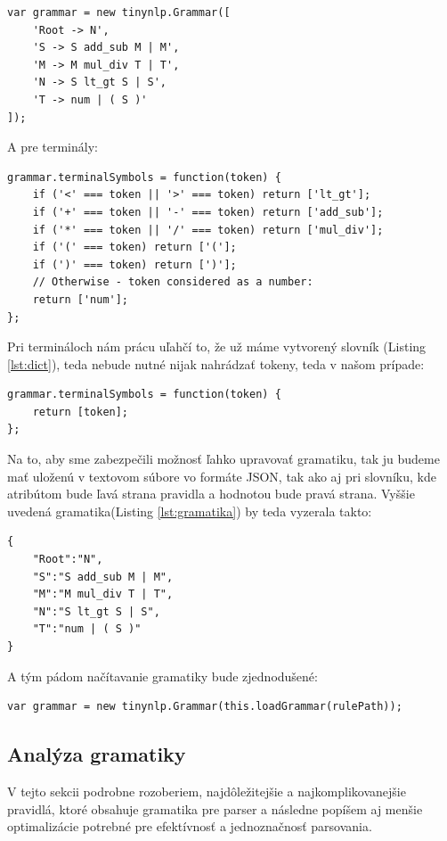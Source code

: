 \documentclass[12pt,a4paper]{report}
\theoremstyle{definition}
\theoremstyle{remark}
\begin{document}
\begin{lstlisting}[caption={Ukážková gramatika},label={lst:gramatika},style=htmlcssjs]
var grammar = new tinynlp.Grammar([
    'Root -> N',
    'S -> S add_sub M | M',
    'M -> M mul_div T | T',
    'N -> S lt_gt S | S',
    'T -> num | ( S )'
]);
\end{lstlisting}

\bigskip A pre terminály: 

\begin{lstlisting}[caption={Vytvorenie pravidiel pre terminály}, style=htmlcssjs]
grammar.terminalSymbols = function(token) {
    if ('<' === token || '>' === token) return ['lt_gt'];
    if ('+' === token || '-' === token) return ['add_sub'];
    if ('*' === token || '/' === token) return ['mul_div'];
    if ('(' === token) return ['('];
    if (')' === token) return [')'];
    // Otherwise - token considered as a number:
    return ['num'];
};
\end{lstlisting}

\bigskip Pri termináloch nám prácu uľahčí to, že už máme vytvorený slovník (Listing \ref{lst:dict}), teda nebude nutné nijak nahrádzať tokeny, teda v našom prípade: \\
\begin{lstlisting}[style=htmlcssjs]
grammar.terminalSymbols = function(token) {
    return [token];
};
\end{lstlisting}
\bigskip
Na to, aby sme zabezpečili možnosť ľahko upravovať gramatiku, tak ju budeme mať uloženú v textovom súbore vo formáte JSON, tak ako aj pri slovníku, kde atribútom bude ľavá strana pravidla a hodnotou bude pravá strana. Vyššie uvedená gramatika(Listing \ref{lst:gramatika}) by teda vyzerala takto:

\begin{lstlisting}[caption={Ukážková gramatika V JSON-e},label={lst:gramatikaJSON},style=htmlcssjs]
{
	"Root":"N",
	"S":"S add_sub M | M",
	"M":"M mul_div T | T",
	"N":"S lt_gt S | S",
	"T":"num | ( S )"
}
\end{lstlisting}

A tým pádom načítavanie gramatiky bude zjednodušené: \\

\begin{lstlisting}[style=htmlcssjs]
var grammar = new tinynlp.Grammar(this.loadGrammar(rulePath));
\end{lstlisting}

\subsection{Analýza gramatiky}
V tejto sekcii podrobne rozoberiem, najdôležitejšie a najkomplikovanejšie pravidlá, ktoré obsahuje gramatika pre parser a následne popíšem aj menšie optimalizácie potrebné pre efektívnosť a jednoznačnosť parsovania.
\end{document}
